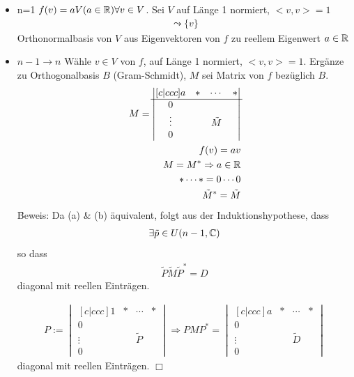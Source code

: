 \begin{itemize}
\item n=1 $f(v) = aV (a \in \mathbb{R}) \forall v \in V$. Sei $V$ auf Länge 1 normiert, $<v, v> = 1$\\
\begin{align}
\leadsto \{v\}
\end{align}
Orthonormalbasis von $V$ aus Eigenvektoren von $f$ zu reellem Eigenwert $a \in \mathbb{R}$
\item $n-1 \rightarrow n$ Wähle $v \in V$ von $f$, auf Länge 1 normiert, $<v, v> = 1$. Ergänze zu Orthogonalbasis $B$ (Gram-Schmidt), $M$ sei Matrix von $f$ bezüglich $B$.
\begin{align}
M = \begin{vmatrix}[c|ccc] a & * &\cdots & * \\ \hline 0 & & & \\ \vdots & & \tilde{M} & \\ 0 & & & \end{vmatrix} \\
f(v) = av \\
M = M^{*} \Rightarrow a \in \mathbb{R} \\
* \cdots * = 0 \cdots 0 \\
\tilde{M}^{*} = \tilde{M}
\end{align}
\f{Beweis:} Da (a) \& (b) äquivalent, folgt aus der Induktionshypothese, dass 
\begin{align}
\exists \tilde{p} \in U(n-1, \mathbb{C})
\end{align}
so dass 
\begin{align}
\tilde{P}\tilde{M}\tilde{P}^{*} = D
\end{align}
diagonal mit reellen Einträgen.

\begin{align}
P := \begin{vmatrix}[c|ccc] 1 & * &\cdots & * \\ \hline 0 & & & \\ \vdots & & \tilde{P} & \\ 0 & & & \end{vmatrix} \Rightarrow PMP^{*} = \begin{vmatrix}[c|ccc] a & * &\cdots & * \\ \hline 0 & & & \\ \vdots & & \tilde{D} & \\ 0 & & & \end{vmatrix} 
\end{align}
diagonal mit reellen Einträgen.
\hspace*{1cm} \hfill $\Box$
\end{itemize}

